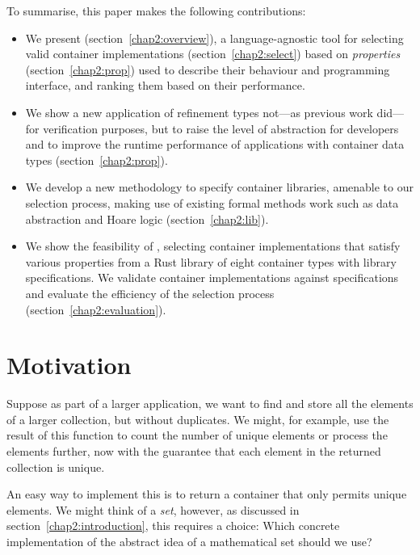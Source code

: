 To summarise, this paper makes the following contributions:
\begin{itemize}
    \item We present \Primrose{} (section~\ref{chap2:overview}), a language-agnostic tool for selecting valid container implementations (section~\ref{chap2:select}) based on \emph{properties} (section~\ref{chap2:prop}) used to describe their behaviour and programming interface, and ranking them based on their performance.
    \item We show a new application of refinement types not---as previous work did---for verification purposes, but to raise the level of abstraction for developers and to improve the runtime performance of applications with container data types (section~\ref{chap2:prop}).
    \item We develop a new methodology to specify container libraries, amenable to our selection process, making use of existing formal methods work such as data abstraction and Hoare logic (section~\ref{chap2:lib}).
    \item We show the feasibility of \Primrose{}, selecting container implementations that satisfy various properties from a Rust library of eight container types with library specifications. We validate container implementations against specifications and evaluate the efficiency of the selection process (section~\ref{chap2:evaluation}).
\end{itemize}

\section{Motivation}
\label{chap2:motivation}
Suppose as part of a larger application, we want to find and store all the elements of a larger collection, but without duplicates.
We might, for example, use the result of this function to count the number of unique elements or process the elements further, now with the guarantee that each element in the returned collection is unique.

An easy way to implement this is to return a container that only permits unique elements.
We might think of a \emph{set}, however, as discussed in section~\ref{chap2:introduction}, this requires a choice:
Which concrete implementation of the abstract idea of a mathematical set should we use? 

